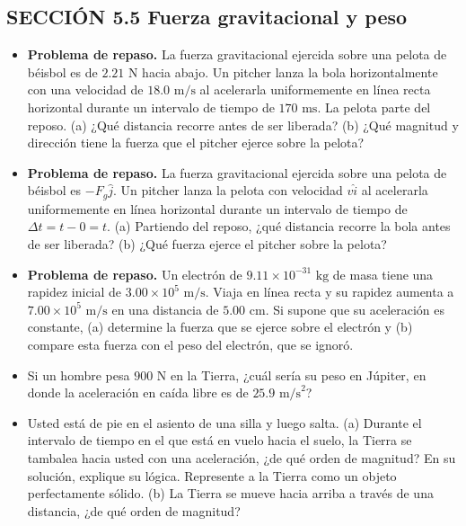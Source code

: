 \documentclass[11pt,a4paper]{article}
\begin{document}
\newpage

\subsection*{SECCIÓN 5.5 Fuerza gravitacional y peso}

\begin{itemize}
    \item[\textbf{9.}] \textbf{Problema de repaso.} La fuerza gravitacional ejercida sobre una pelota de béisbol es de $2.21 \text{ N}$ hacia abajo. Un pitcher lanza la bola horizontalmente con una velocidad de $18.0 \text{ m/s}$ al acelerarla uniformemente en línea recta horizontal durante un intervalo de tiempo de $170 \text{ ms}$. La pelota parte del reposo. (a) ¿Qué distancia recorre antes de ser liberada? (b) ¿Qué magnitud y dirección tiene la fuerza que el pitcher ejerce sobre la pelota?
    \vspace*{6cm}

    \item[\textbf{10.}] \textbf{Problema de repaso.} La fuerza gravitacional ejercida sobre una pelota de béisbol es $-F_g\hat{j}$. Un pitcher lanza la pelota con velocidad $v\hat{i}$ al acelerarla uniformemente en línea horizontal durante un intervalo de tiempo de $\Delta t = t - 0 = t$. (a) Partiendo del reposo, ¿qué distancia recorre la bola antes de ser liberada? (b) ¿Qué fuerza ejerce el pitcher sobre la pelota?
    \vspace*{6cm}

    \item[\textbf{11.}] \textbf{Problema de repaso.} Un electrón de $9.11 \times 10^{-31} \text{ kg}$ de masa tiene una rapidez inicial de $3.00 \times 10^5 \text{ m/s}$. Viaja en línea recta y su rapidez aumenta a $7.00 \times 10^5 \text{ m/s}$ en una distancia de $5.00 \text{ cm}$. Si supone que su aceleración es constante, (a) determine la fuerza que se ejerce sobre el electrón y (b) compare esta fuerza con el peso del electrón, que se ignoró.
    \vspace*{6cm}

    \item[\textbf{12.}] Si un hombre pesa $900 \text{ N}$ en la Tierra, ¿cuál sería su peso en Júpiter, en donde la aceleración en caída libre es de $25.9 \text{ m/s}^2$?
    \vspace*{5cm}

    \item[\textbf{13.}] Usted está de pie en el asiento de una silla y luego salta. (a) Durante el intervalo de tiempo en el que está en vuelo hacia el suelo, la Tierra se tambalea hacia usted con una aceleración, ¿de qué orden de magnitud? En su solución, explique su lógica. Represente a la Tierra como un objeto perfectamente sólido. (b) La Tierra se mueve hacia arriba a través de una distancia, ¿de qué orden de magnitud?
    \vspace*{6cm}
\end{itemize}
\end{document}
